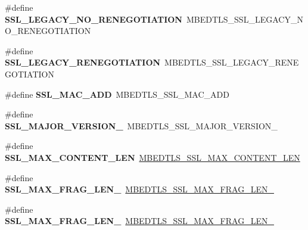 \begin{DoxyCompactItemize}
\item 
\mbox{\label{compat-1_83_8h_a63a004d5c7caac017c62bbfcfa533eae}} 
\#define {\bfseries S\+S\+L\+\_\+\+L\+E\+G\+A\+C\+Y\+\_\+\+N\+O\+\_\+\+R\+E\+N\+E\+G\+O\+T\+I\+A\+T\+I\+ON}~M\+B\+E\+D\+T\+L\+S\+\_\+\+S\+S\+L\+\_\+\+L\+E\+G\+A\+C\+Y\+\_\+\+N\+O\+\_\+\+R\+E\+N\+E\+G\+O\+T\+I\+A\+T\+I\+ON
\item 
\mbox{\label{compat-1_83_8h_a06a288ea509f8e76fcb52a5f46cb3908}} 
\#define {\bfseries S\+S\+L\+\_\+\+L\+E\+G\+A\+C\+Y\+\_\+\+R\+E\+N\+E\+G\+O\+T\+I\+A\+T\+I\+ON}~M\+B\+E\+D\+T\+L\+S\+\_\+\+S\+S\+L\+\_\+\+L\+E\+G\+A\+C\+Y\+\_\+\+R\+E\+N\+E\+G\+O\+T\+I\+A\+T\+I\+ON
\item 
\mbox{\label{compat-1_83_8h_a7e5e7a7337db843467532cbcf48d0fb3}} 
\#define {\bfseries S\+S\+L\+\_\+\+M\+A\+C\+\_\+\+A\+DD}~M\+B\+E\+D\+T\+L\+S\+\_\+\+S\+S\+L\+\_\+\+M\+A\+C\+\_\+\+A\+DD
\item 
\mbox{\label{compat-1_83_8h_a84391a43fea28830ad138e2418a9728b}} 
\#define {\bfseries S\+S\+L\+\_\+\+M\+A\+J\+O\+R\+\_\+\+V\+E\+R\+S\+I\+O\+N\+\_}~M\+B\+E\+D\+T\+L\+S\+\_\+\+S\+S\+L\+\_\+\+M\+A\+J\+O\+R\+\_\+\+V\+E\+R\+S\+I\+O\+N\+\_
\item 
\mbox{\label{compat-1_83_8h_a70bafb07a819e6bf9df2c97ce6dd139d}} 
\#define {\bfseries S\+S\+L\+\_\+\+M\+A\+X\+\_\+\+C\+O\+N\+T\+E\+N\+T\+\_\+\+L\+EN}~\mbox{\hyperlink{ssl_8h_a4a5b73bae4d762a05684812ad6c6b1b2}{M\+B\+E\+D\+T\+L\+S\+\_\+\+S\+S\+L\+\_\+\+M\+A\+X\+\_\+\+C\+O\+N\+T\+E\+N\+T\+\_\+\+L\+EN}}
\item 
\mbox{\label{compat-1_83_8h_ad47cd1dca11882e95eb0910d68d6e5c8}} 
\#define {\bfseries S\+S\+L\+\_\+\+M\+A\+X\+\_\+\+F\+R\+A\+G\+\_\+\+L\+E\+N\+\_}~\mbox{\hyperlink{ssl_8h_ad2d55e32e6514fb146b8681ea914b991}{M\+B\+E\+D\+T\+L\+S\+\_\+\+S\+S\+L\+\_\+\+M\+A\+X\+\_\+\+F\+R\+A\+G\+\_\+\+L\+E\+N\+\_}}
\item 
\mbox{\label{compat-1_83_8h_a70fac39e6cff2c09dd74185951c06695}} 
\#define {\bfseries S\+S\+L\+\_\+\+M\+A\+X\+\_\+\+F\+R\+A\+G\+\_\+\+L\+E\+N\+\_}~\mbox{\hyperlink{ssl_8h_a08a6eb65d87c8d6565f47689d4e80bd3}{M\+B\+E\+D\+T\+L\+S\+\_\+\+S\+S\+L\+\_\+\+M\+A\+X\+\_\+\+F\+R\+A\+G\+\_\+\+L\+E\+N\+\_}}

\end{DoxyCompactItemize}
